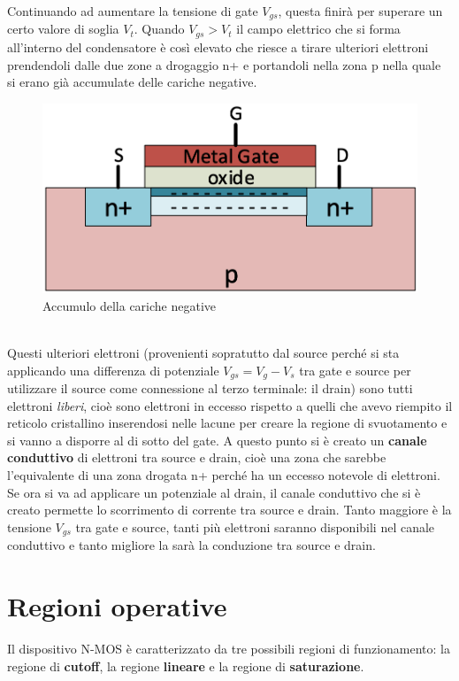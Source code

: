 \documentclass[12pt, a4paper]{report}
\begin{document}
Continuando ad aumentare la tensione di gate $V_{gs}$, questa finirà per superare un certo valore di soglia $V_t$. Quando $V_{gs} > V_t$ il campo elettrico che si forma all'interno del condensatore è così elevato che riesce a tirare ulteriori elettroni prendendoli dalle due zone a drogaggio n+ e portandoli nella zona p nella quale si erano già accumulate delle cariche negative.
\begin{figure}[h]
    \centering
    \includegraphics[scale=0.4,angle=0]{n_mos_canale.png}
    \caption{Accumulo della cariche negative}
    \label{svuotamento}
\end{figure}
\\Questi ulteriori elettroni (provenienti sopratutto dal source perché si sta applicando una differenza di potenziale $V_{gs} = V_{g} - V_s$ tra gate e source per utilizzare il source come connessione al terzo terminale: il drain) sono tutti elettroni \textit{liberi}, cioè sono elettroni in eccesso rispetto a quelli che avevo riempito il reticolo cristallino inserendosi nelle lacune per creare la regione di svuotamento e si vanno a disporre al di sotto del gate. A questo punto si è creato un \textbf{canale conduttivo } di elettroni tra source e drain, cioè una zona che sarebbe l'equivalente di una zona drogata n+ perché ha un eccesso notevole di elettroni. Se ora si va ad applicare un potenziale al drain, il canale conduttivo che si è creato permette lo scorrimento di corrente tra source e drain. Tanto maggiore è la tensione $V_{gs}$ tra gate e source, tanti più elettroni saranno disponibili nel canale conduttivo e tanto migliore la sarà la conduzione tra source e drain.

\section{Regioni operative}
Il dispositivo N-MOS è caratterizzato da tre possibili regioni di funzionamento: la regione di \textbf{cutoff}, la regione \textbf{lineare} e la regione di \textbf{saturazione}.
\end{document}
